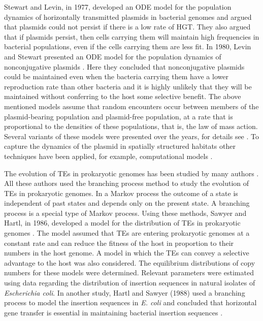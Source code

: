 Stewart and Levin, in 1977, developed an ODE model for the population dynamics of horizontally transmitted plasmids in bacterial genomes \cite{ stewart_population_1977} and argued that plasmids could not persist if there is a low rate of HGT. They also argued that if plasmids persist, then cells carrying them will maintain high frequencies in bacterial populations, even if the cells carrying them are less fit. In 1980, Levin and Stewart presented an ODE model for the population dynamics of nonconjugative plasmids \cite{levin_population_1980}. Here they concluded that nonconjugative plasmids could be maintained even when the bacteria carrying them have a lower reproduction rate than other bacteria and it is highly unlikely that they will be maintained without conferring to the host some selective benefit. The above mentioned models assume that random encounters occur between members of the plasmid-bearing population and plasmid-free population, at a rate that is proportional to the densities of these populations, that is, the law of mass action. Several variants of these models were presented over the years, for details see \cite{freter_experimental_1983, lundquist_transitory_1986, zhong_accounting_2010, turner_tradeoff_1998}. To capture the dynamics of the plasmid in spatially structured habitats other techniques have been applied, for example, computational models \cite{ krone_modelling_2007, lagido_model_2003, ponciano_population_2007, merkey_growth_2011, connelly_modeling_2011}.

The evolution of TEs in prokaryotic genomes has been studied by many authors \cite{hartl_why_1988, basten_branching-process_1991, moody_branching_1988, dolgin_fate_2006, wagner_cooperation_2006, drakos_extinction_2015, rabbani_dynamics_2016}. All these authors used the branching process method to study the evolution
of TEs in prokaryotic genomes.  In a Markov process the outcome of a state is independent of past states and depends only on the present state.  A branching process is a special type of Markov process. Using these methods, Sawyer and Hartl, in 1986, developed a model for the distribution of TEs in prokaryotic genomes \cite{sawyer_distribution_1986}. The model assumed that TEs are entering prokaryotic genomes at a constant rate and can reduce the fitness of the host in proportion to their numbers in the host genome. A model in which the TEs can convey a selective advantage to the host was also considered. The equilibrium distributions of copy numbers for these models were determined. Relevant parameters were estimated using data regarding the distribution of insertion sequences in natural isolates of \textit{Escherichia coli}. In another study, Hartl and Sawyer (1988) used a branching process to model the insertion sequences in \textit{E. coli} and concluded that horizontal gene transfer is essential in maintaining bacterial insertion sequences \cite{hartl_why_1988}. 

